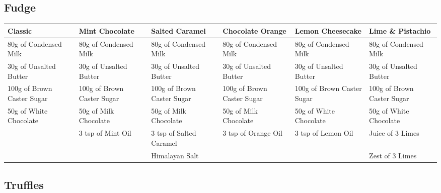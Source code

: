 \documentclass[11pt, english]{article}
\begin{document}
\newpage

	\subsection{Fudge}

	\begin{table}[h]
	        \scriptsize
	\begin{center}
	\begin{tabular}{p{2.5cm}p{2.5cm}p{2.5cm}p{2.5cm}p{2.5cm}p{2.5cm}}
	        \hline
	        \textbf{Classic} & \textbf{Mint Chocolate} & \textbf{Salted Caramel} & \textbf{Chocolate Orange} & \textbf{Lemon Cheesecake} & \textbf{Lime \& Pistachio}\\
	        \hline
	        80g of Condensed Milk & 80g of Condensed Milk & 80g of Condensed Milk & 80g of Condensed Milk & 80g of Condensed Milk & 80g of Condensed Milk\\
	        30g of Unsalted Butter & 30g of Unsalted Butter & 30g of Unsalted Butter & 30g of Unsalted Butter & 30g of Unsalted Butter & 30g of Unsalted Butter\\
	        100g of Brown Caster Sugar & 100g of Brown Caster Sugar & 100g of Brown Caster Sugar & 100g of Brown Caster Sugar & 100g of Brown Caster Sugar & 100g of Brown Caster Sugar\\
	        50g of White Chocolate & 50g of Milk Chocolate & 50g of Milk Chocolate & 50g of Milk Chocolate & 50g of White Chocolate & 50g of White Chocolate\\
	        & 3 tsp of Mint Oil & 3 tsp of Salted Caramel & 3 tsp of Orange Oil & 3 tsp of Lemon Oil & Juice of 3 Limes\\
	        & & Himalayan Salt & & & Zest of 3 Limes\\
        	\hline
	\end{tabular}
	\end{center}
	\end{table}

\newpage

	\subsection{Truffles}
\end{document}
